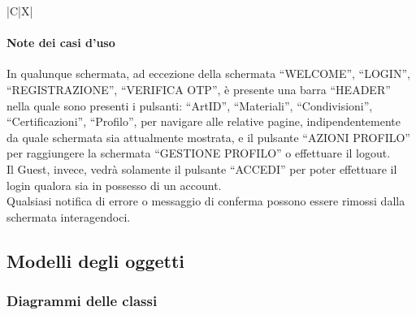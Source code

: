 \begin{tabularx}{\textwidth}{|C|X|}
{\begin{enumerate}
\begin{enumerate}
    \end{enumerate}
\end{enumerate}
}
\hline
\end{tabularx}

\clearpage

\paragraph{Note dei casi d'uso}
In qualunque schermata, ad eccezione della schermata ``WELCOME'', ``LOGIN'', ``REGISTRAZIONE'', ``VERIFICA OTP'', è presente una barra ``HEADER'' nella quale sono presenti i pulsanti: ``ArtID'', ``Materiali'', ``Condivisioni'', ``Certificazioni'', ``Profilo'', per navigare alle relative pagine, indipendentemente da quale schermata sia attualmente mostrata, e il pulsante ``AZIONI PROFILO'' per raggiungere la schermata ``GESTIONE PROFILO'' o effettuare il logout.\\
Il Guest, invece, vedrà solamente il pulsante ``ACCEDI'' per poter effettuare il login qualora sia in possesso di un account.\\
Qualsiasi notifica di errore o messaggio di conferma possono essere rimossi dalla schermata interagendoci.

\clearpage







\subsection{Modelli degli oggetti}

\clearpage

\clearpage


\newpage

\subsubsection{Diagrammi delle classi}


\newpage



\newpage


